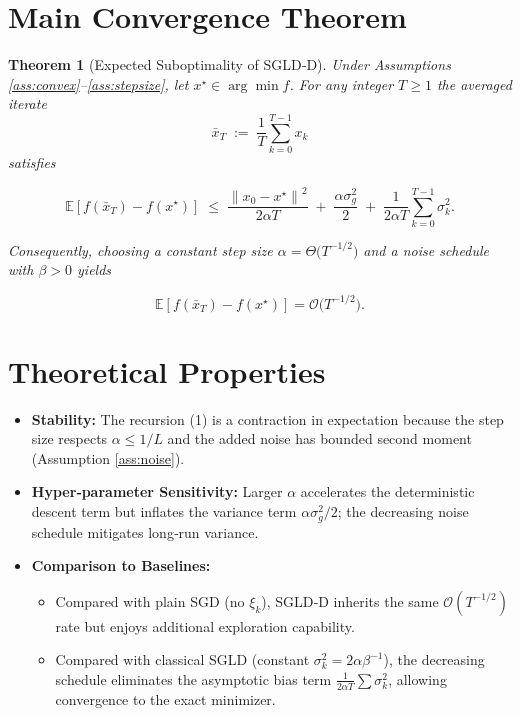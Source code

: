 \documentclass[11pt]{article}
\newtheorem{theorem}{Theorem}
\newcommand{\E}{\mathbb{E}}
\newcommand{\norm}[1]{\left\|#1\right\|}
\begin{document}
\section*{Main Convergence Theorem}
\begin{theorem}[Expected Suboptimality of SGLD‑D]\label{thm:main}
Under Assumptions \ref{ass:convex}–\ref{ass:stepsize}, let $x^{\star}\in\arg\min f$.
For any integer $T\ge1$ the averaged iterate  
\[
\bar x_{T}\;:=\;\frac{1}{T}\sum_{k=0}^{T-1}x_{k}
\]
satisfies  

\[
\E\!\left[f(\bar x_{T})-f(x^{\star})\right]
\;\le\;
\frac{\norm{x_{0}-x^{\star}}^{2}}{2\alpha T}
\;+\;
\frac{\alpha\sigma_{g}^{2}}{2}
\;+\;
\frac{1}{2\alpha T}\sum_{k=0}^{T-1}\sigma_{k}^{2}.
\tag{6}
\]

Consequently, choosing a constant step size $\alpha = \Theta\!\big(T^{-1/2}\big)$ and a noise schedule with $\beta>0$ yields  

\[
\E\!\left[f(\bar x_{T})-f(x^{\star})\right]=\mathcal O\!\big(T^{-1/2}\big).
\tag{7}
\]
\end{theorem}

\section*{Theoretical Properties}
\begin{itemize}
    \item \textbf{Stability:} The recursion (1) is a contraction in expectation because the step size respects $\alpha\le1/L$ and the added noise has bounded second moment (Assumption \ref{ass:noise}).
    \item \textbf{Hyper‑parameter Sensitivity:} Larger $\alpha$ accelerates the deterministic descent term but inflates the variance term $\alpha\sigma_{g}^{2}/2$; the decreasing noise schedule mitigates long‑run variance.
    \item \textbf{Comparison to Baselines:}
    \begin{itemize}
        \item Compared with plain SGD (no $\xi_{k}$), SGLD‑D inherits the same $\mathcal O(T^{-1/2})$ rate but enjoys additional exploration capability.
        \item Compared with classical SGLD (constant $\sigma_{k}^{2}=2\alpha\beta^{-1}$), the decreasing schedule eliminates the asymptotic bias term $\frac{1}{2\alpha T}\sum\sigma_{k}^{2}$, allowing convergence to the exact minimizer.
    \end{itemize}
\end{itemize}
\end{document}
